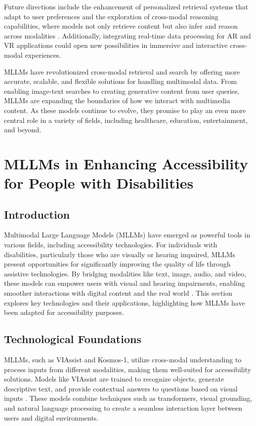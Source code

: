 Future directions include the enhancement of personalized retrieval systems that adapt to user preferences and the exploration of cross-modal reasoning capabilities, where models not only retrieve content but also infer and reason across modalities \cite{vs2024yin,vs2024palmagomez}. Additionally, integrating real-time data processing for AR and VR applications could open new possibilities in immersive and interactive cross-modal experiences.

MLLMs have revolutionized cross-modal retrieval and search by offering more accurate, scalable, and flexible solutions for handling multimodal data. From enabling image-text searches to creating generative content from user queries, MLLMs are expanding the boundaries of how we interact with multimedia content. As these models continue to evolve, they promise to play an even more central role in a variety of fields, including healthcare, education, entertainment, and beyond.

\section{MLLMs in Enhancing Accessibility for People with Disabilities}

\subsection{Introduction}
Multimodal Large Language Models (MLLMs) have emerged as powerful tools in various fields, including accessibility technologies. For individuals with disabilities, particularly those who are visually or hearing impaired, MLLMs present opportunities for significantly improving the quality of life through assistive technologies. By bridging modalities like text, image, audio, and video, these models can empower users with visual and hearing impairments, enabling smoother interactions with digital content and the real world \cite{vs2024yang,vs2024huang}. This section explores key technologies and their applications, highlighting how MLLMs have been adapted for accessibility purposes.

\subsection{Technological Foundations}
MLLMs, such as VIAssist and Kosmos-1, utilize cross-modal understanding to process inputs from different modalities, making them well-suited for accessibility solutions. Models like VIAssist are trained to recognize objects, generate descriptive text, and provide contextual answers to questions based on visual inputs \cite{vs2024yang}. These models combine techniques such as transformers, visual grounding, and natural language processing to create a seamless interaction layer between users and digital environments.

